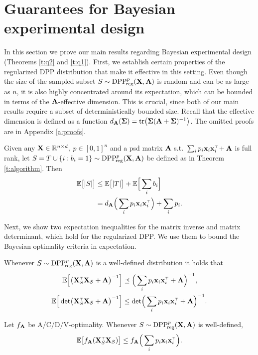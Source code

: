 \documentclass[11pt]{article}
\begin{document}
\section{Guarantees for Bayesian experimental design}
\label{s:guarantees}
In this section we prove our main results regarding Bayesian
experimental design (Theorems \ref{t:q2} and \ref{t:q1}). First, we
establish certain properties of the regularized DPP distribution that
make it effective in this setting. Even though the size of the
sampled subset $S\sim{{\mathrm{DPP}}_{\!\mathrm{reg}}^{p}}(\mathbf X,\mathbf A)$ is random and can be as large
as $n$, it is also highly concentrated around its expectation, which
can be bounded in terms of the $\mathbf A$-effective dimension. This is
crucial, since both of our main results require a subset of
deterministically bounded size. Recall that the effective dimension is
defined as a function $d_{\mathbf A}(\mathbf{\Sigma}) =
\mathrm{tr}\big(\mathbf{\Sigma}(\mathbf A+\mathbf{\Sigma})^{-1}\big)$. The omitted proofs are in
Appendix \ref{a:proofs}.
\begin{lemma}\label{l:size}
  Given any $\mathbf X\in\mathbb R^{n\times d}$, $p\in[0,1]^n$ and a psd matrix $\mathbf A$
s.t.~$\sum_ip_i\x_i\x_i^\top\!+\A$ is
full rank, let $S=T\cup \{i:b_i=1\}\sim {{\mathrm{DPP}}_{\!\mathrm{reg}}^{p}}(\mathbf X,\mathbf A)$ be defined
as in Theorem \ref{t:algorithm}. Then
\begin{align*}
  \E\big[|S|\big] &\leq \E\big[|T|\big] + \E\Big[\sum_i b_i\Big]  \\
                  & = d_{\A}\Big(\sum_ip_i\x_i\x_i^\top\Big) + \sum_i p_i.
\end{align*}
\end{lemma}
Next, we show two expectation inequalities for the matrix inverse and
matrix determinant, which hold for the regularized DPP.
We use them to bound the Bayesian optimality criteria in expectation.
\begin{lemma}\label{t:expectations}
Whenever $S\sim {{\mathrm{DPP}}_{\!\mathrm{reg}}^{p}}(\mathbf X,\mathbf A)$ is a well-defined distribution it holds that
\begin{align}
  \E\Big[\big(\X_S^\top\X_S+\A\big)^{-1}\Big]
  &\preceq \Big(
    \sum_ip_i\x_i\x_i^\top +\A \Big)^{-1},\label{eq:sqinv}
  \\
\E\Big[\det\!\big(\X_S^\top\X_S+\A\big)^{-1}\Big]
  &\leq\det\!\Big(
    \sum_ip_i\x_i\x_i^\top +\A \Big)^{-1}.\label{eq:det}
\end{align}
\end{lemma}
\begin{corollary}\label{c:expectations}
Let $f_{\mathbf A}$ be A/C/D/V-optimality. Whenever $S\sim{{\mathrm{DPP}}_{\!\mathrm{reg}}^{p}}(\mathbf X,\mathbf A)$ is
well-defined,
\begin{align*}
  \E\big[f_{\A}(\X_S^\top\X_S)\big] \leq f_{\A}\Big(\sum_i p_i\x_i\x_i^\top\Big).
\end{align*}
\end{corollary}
\end{document}

